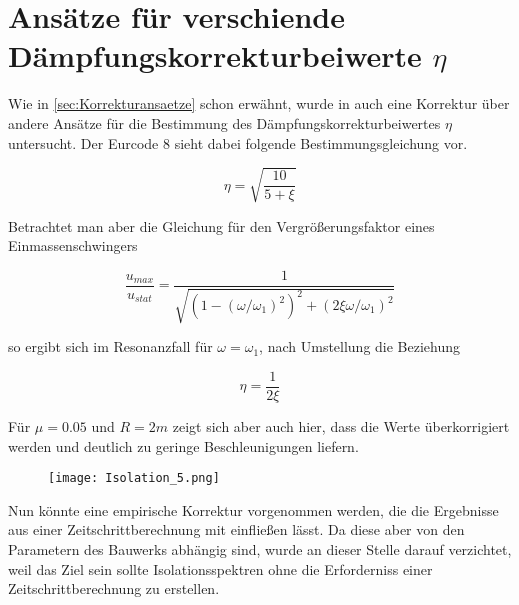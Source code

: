 \section{Ansätze für verschiende Dämpfungskorrekturbeiwerte $\eta$}

Wie in \cref{sec:Korrekturansaetze} schon erwähnt, wurde in \cite{Isemann} auch eine Korrektur über andere Ansätze für die Bestimmung des Dämpfungskorrekturbeiwertes $\eta$ untersucht.
Der Eurcode 8 sieht dabei folgende Bestimmungsgleichung vor.

\begin{equation*}
\eta = \sqrt{\frac{10}{5+\xi}}
\end{equation*}

Betrachtet man aber die Gleichung für den Vergrößerungsfaktor eines Einmassenschwingers

\begin{equation}
\frac{u_{max}}{u_{stat}} = \frac{1}{\sqrt{(1 - (\omega / \omega_1)^2)^2 + (2 \xi \omega / \omega_1)^2}}
\end{equation}

so ergibt sich im Resonanzfall für $\omega = \omega_1$, nach Umstellung die Beziehung

\begin{equation}
\eta = \frac{1}{2\xi}
\end{equation}

Für $\mu = 0.05$ und $R = 2 m$ zeigt sich aber auch hier, dass die Werte überkorrigiert werden und deutlich zu geringe Beschleunigungen liefern.

\begin{figure}[H]
    \centering
    \texttt{[image: Isolation\_5.png]}
    \caption{}
    \label{fig:Isolation5}
\end{figure}

Nun könnte eine empirische Korrektur vorgenommen werden, die die Ergebnisse aus einer Zeitschrittberechnung mit einfließen lässt. Da diese aber von den Parametern des Bauwerks abhängig sind, wurde an dieser Stelle darauf verzichtet, weil das Ziel sein sollte Isolationsspektren ohne die Erforderniss einer Zeitschrittberechnung zu erstellen.

\pagebreak
